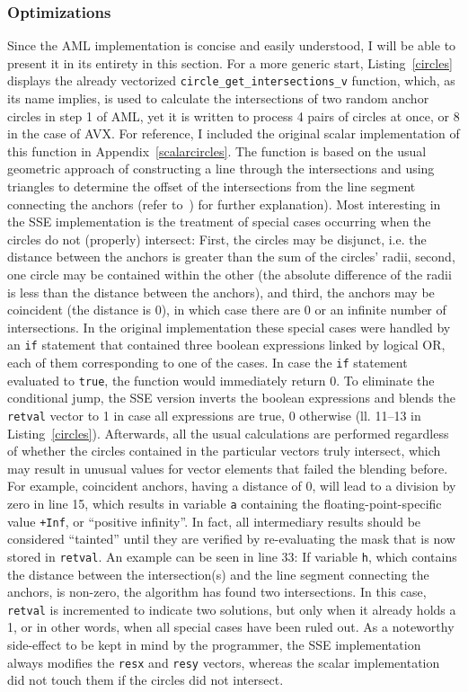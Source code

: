 \subsubsection{Optimizations}
Since the AML implementation is concise and easily understood, I will be able to present it in its entirety in this section. For a more generic start, Listing~\ref{circles} displays the already vectorized \texttt{circle\_get\_intersections\_v} function, which, as its name implies, is used to calculate the intersections of two random anchor circles in step 1 of AML, yet it is written to process 4 pairs of circles at once, or 8 in the case of AVX. For reference, I included the original scalar implementation of this function in Appendix~\ref{scalarcircles}. The function is based on the usual geometric approach of constructing a line through the intersections and using triangles to determine the offset of the intersections from the line segment connecting the anchors (refer to~\cite{bourke1997circles}) for further explanation). Most interesting in the SSE implementation is the treatment of special cases occurring when the circles do not (properly) intersect: First, the circles may be disjunct, i.e. the distance between the anchors is greater than the sum of the circles' radii, second, one circle may be contained within the other (the absolute difference of the radii is less than the distance between the anchors), and third, the anchors may be coincident (the distance is 0), in which case there are 0 or an infinite number of intersections. In the original implementation these special cases were handled by an \texttt{if} statement that contained three boolean expressions linked by logical OR, each of them corresponding to one of the cases. In case the \texttt{if} statement evaluated to \texttt{true}, the function would immediately return 0. To eliminate the conditional jump, the SSE version inverts the boolean expressions and blends the \texttt{retval} vector to 1 in case all expressions are true, 0 otherwise (ll. 11--13 in Listing~\ref{circles}). Afterwards, all the usual calculations are performed regardless of whether the circles contained in the particular vectors truly intersect, which may result in unusual values for vector elements that failed the blending before. For example, coincident anchors, having a distance of 0, will lead to a division by zero in line 15, which results in variable \texttt{a} containing the floating-point-specific value \texttt{+Inf}, or ``positive infinity''. In fact, all intermediary results should be considered ``tainted'' until they are verified by re-evaluating the mask that is now stored in \texttt{retval}. An example can be seen in line 33: If variable \texttt{h}, which contains the distance between the intersection(s) and the line segment connecting the anchors, is non-zero, the algorithm has found two intersections. In this case, \texttt{retval} is incremented to indicate two solutions, but only when it already holds a 1, or in other words, when all special cases have been ruled out. As a noteworthy side-effect to be kept in mind by the programmer, the SSE implementation always modifies the \texttt{resx} and \texttt{resy} vectors, whereas the scalar implementation did not touch them if the circles did not intersect.

